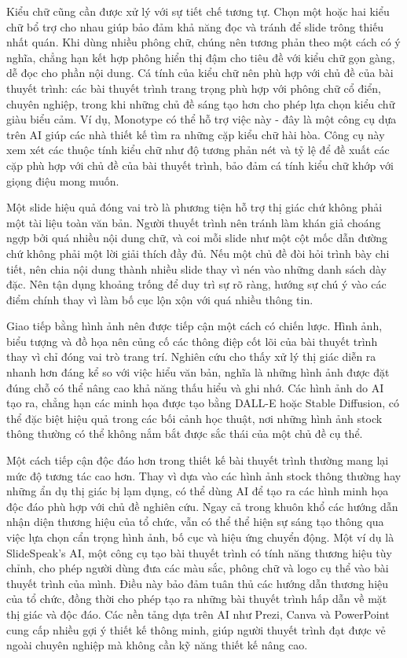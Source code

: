 Kiểu chữ cũng cần được xử lý với sự tiết chế tương tự. Chọn một hoặc hai kiểu chữ bổ trợ cho nhau giúp bảo đảm khả năng đọc và tránh để slide trông thiếu nhất quán. Khi dùng nhiều phông chữ, chúng nên tương phản theo một cách có ý nghĩa, chẳng hạn kết hợp phông hiển thị đậm cho tiêu đề với kiểu chữ gọn gàng, dễ đọc cho phần nội dung. Cá tính của kiểu chữ nên phù hợp với chủ đề của bài thuyết trình: các bài thuyết trình trang trọng phù hợp với phông chữ cổ điển, chuyên nghiệp, trong khi những chủ đề sáng tạo hơn cho phép lựa chọn kiểu chữ giàu biểu cảm. Ví dụ, Monotype có thể hỗ trợ việc này - đây là một công cụ dựa trên AI giúp các nhà thiết kế tìm ra những cặp kiểu chữ hài hòa. Công cụ này xem xét các thuộc tính kiểu chữ như độ tương phản nét và tỷ lệ để đề xuất các cặp phù hợp với chủ đề của bài thuyết trình, bảo đảm cá tính kiểu chữ khớp với giọng điệu mong muốn.

Một slide hiệu quả đóng vai trò là phương tiện hỗ trợ thị giác chứ không phải một tài liệu toàn văn bản. Người thuyết trình nên tránh làm khán giả choáng ngợp bởi quá nhiều nội dung chữ, và coi mỗi slide như một cột mốc dẫn đường chứ không phải một lời giải thích đầy đủ. Nếu một chủ đề đòi hỏi trình bày chi tiết, nên chia nội dung thành nhiều slide thay vì nén vào những danh sách dày đặc. Nên tận dụng khoảng trống để duy trì sự rõ ràng, hướng sự chú ý vào các điểm chính thay vì làm bố cục lộn xộn với quá nhiều thông tin.

Giao tiếp bằng hình ảnh nên được tiếp cận một cách có chiến lược. Hình ảnh, biểu tượng và đồ họa nên củng cố các thông điệp cốt lõi của bài thuyết trình thay vì chỉ đóng vai trò trang trí. Nghiên cứu cho thấy xử lý thị giác diễn ra nhanh hơn đáng kể so với việc hiểu văn bản, nghĩa là những hình ảnh được đặt đúng chỗ có thể nâng cao khả năng thấu hiểu và ghi nhớ. Các hình ảnh do AI tạo ra, chẳng hạn các minh họa được tạo bằng DALL-E hoặc Stable Diffusion, có thể đặc biệt hiệu quả trong các bối cảnh học thuật, nơi những hình ảnh stock thông thường có thể không nắm bắt được sắc thái của một chủ đề cụ thể.

Một cách tiếp cận độc đáo hơn trong thiết kế bài thuyết trình thường mang lại mức độ tương tác cao hơn. Thay vì dựa vào các hình ảnh stock thông thường hay những ẩn dụ thị giác bị lạm dụng, có thể dùng AI để tạo ra các hình minh họa độc đáo phù hợp với chủ đề nghiên cứu. Ngay cả trong khuôn khổ các hướng dẫn nhận diện thương hiệu của tổ chức, vẫn có thể thể hiện sự sáng tạo thông qua việc lựa chọn cẩn trọng hình ảnh, bố cục và hiệu ứng chuyển động. Một ví dụ là SlideSpeak's AI, một công cụ tạo bài thuyết trình có tính năng thương hiệu tùy chỉnh, cho phép người dùng đưa các màu sắc, phông chữ và logo cụ thể vào bài thuyết trình của mình. Điều này bảo đảm tuân thủ các hướng dẫn thương hiệu của tổ chức, đồng thời cho phép tạo ra những bài thuyết trình hấp dẫn về mặt thị giác và độc đáo. Các nền tảng dựa trên AI như Prezi, Canva và PowerPoint cung cấp nhiều gợi ý thiết kế thông minh, giúp người thuyết trình đạt được vẻ ngoài chuyên nghiệp mà không cần kỹ năng thiết kế nâng cao.

